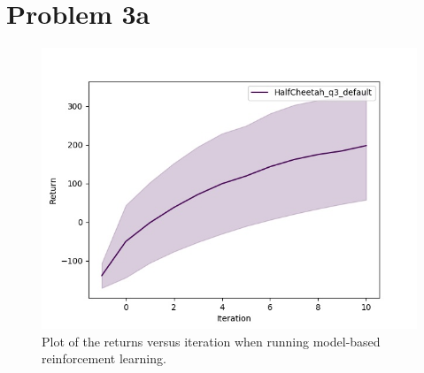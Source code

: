 \documentclass[a4paper]{article}
\begin{document}
\pagebreak

\section*{Problem 3a}
\begin{figure}[H]
\centering
\includegraphics[width=1\textwidth]{p3a.jpg}
\caption{Plot of the returns versus iteration when running model-based reinforcement learning.}
\end{figure}

\pagebreak
\end{document}
